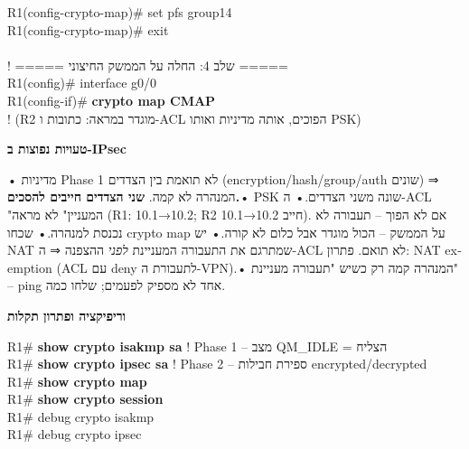 \documentclass[11pt]{article}
\newcommand{\enLR}[1]{\textenglish{#1}}
\newcommand{\code}[1]{\textenglish{\codefont #1}}
\newcommand{\subheading}[1]{\vskip6pt{\bfseries\color{h3}#1\par}\vskip2pt}
\newcommand{\boxtitle}[1]{{\bfseries\color{boxti}#1}}
\newenvironment{mistakebox}{\colorlet{boxti}{misti}\begin{mdframed}[backgroundcolor=misbg,linecolor=misfr,rightline=true,leftline=false,topline=false,bottomline=false,linewidth=2pt,innertopmargin=6pt,innerbottommargin=6pt,innerleftmargin=8pt,innerrightmargin=8pt,skipabove=6pt,skipbelow=6pt]}{\end{mdframed}}
\begin{document}
\begin{codebox}
\begin{english}
R1(config-crypto-map)\# set pfs group14\\
R1(config-crypto-map)\# exit\\
~\\
\textcolor{ccom}{\texthebrew{! ===== שלב \enLR{4}: החלה על הממשק החיצוני =====}}\\
R1(config)\# interface g0/0\\
R1(config-if)\# \textcolor{cbold}{\textbf{crypto map CMAP}}\\
\textcolor{ccom}{\texthebrew{! \enLR{(R2} מוגדר במראה: כתובות ו-\enLR{ACL} הפוכים, אותה מדיניות ואותו \enLR{PSK)}}}
\end{english}\end{codebox}

\begin{mistakebox}\boxtitle{טעויות נפוצות ב-\enLR{IPsec}}\par  • מדיניות \enLR{Phase 1} לא תואמת בין הצדדים \enLR{(encryption/hash/group/auth} שונים) ⇒ המנהרה לא קמה. \textbf{שני הצדדים חייבים להסכים.}\newline  • \enLR{PSK} שונה משני הצדדים.\newline  • ה-\enLR{ACL "}המעניין" לא מראה \enLR{(R1: 10.1}→\enLR{10.2; R2} חייב \enLR{10.2}→\enLR{10.1).} אם לא הפוך – תעבורה לא נכנסת למנהרה.\newline  • שכחו \code{crypto map} על הממשק – הכול מוגדר אבל כלום לא קורה.\newline  • יש \enLR{NAT} שמתרגם את התעבורה המעניינת \emph{לפני} ההצפנה ⇒ ה-\enLR{ACL} לא תואם. פתרון: \enLR{NAT exemption (ACL} עם \enLR{deny} לתעבורת ה-\enLR{VPN).}\newline  • המנהרה קמה רק כשיש "תעבורה מעניינת" – \enLR{ping} אחד לא מספיק לפעמים; שלחו כמה.\end{mistakebox}

\subheading{וריפיקציה ופתרון תקלות}

\begin{codebox}\begin{english}\codefont\footnotesize\color{cfg}\setlength{\parindent}{0pt}
R1\# \textcolor{cbold}{\textbf{show crypto isakmp sa}}          \textcolor{ccom}{\texthebrew{! \enLR{Phase 1} – מצב \enLR{QM\_IDLE} = הצליח}}\\
R1\# \textcolor{cbold}{\textbf{show crypto ipsec sa}}           \textcolor{ccom}{\texthebrew{! \enLR{Phase 2} – ספירת חבילות \enLR{encrypted/decrypted}}}\\
R1\# \textcolor{cbold}{\textbf{show crypto map}}\\
R1\# \textcolor{cbold}{\textbf{show crypto session}}\\
R1\# debug crypto isakmp\\
R1\# debug crypto ipsec
\end{english}\end{codebox}
\end{document}
